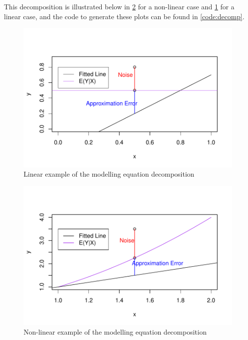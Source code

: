 \documentclass[nohyperref]{article}
\theoremstyle{plain}
\theoremstyle{definition}
\theoremstyle{remark}
\begin{document}
This decomposition is illustrated below in \cref{decompNonLinear} for a non-linear case and \cref{decompLinear} for a linear case, and the code to generate these plots can be found in \cref{code:decomp}.
\begin{figure}[!h]
\begin{center}
\centerline{\includegraphics[width=\columnwidth]{decompLinear.pdf}}
\caption{Linear example of the modelling equation decomposition}
\label{decompLinear}
\end{center}
\end{figure}


\pagebreak

\begin{figure}[!h]
\begin{center}
\centerline{\includegraphics[width=\columnwidth]{decompNonLinear.pdf}}
\caption{Non-linear example of the modelling equation decomposition}
\label{decompNonLinear}
\end{center}
\end{figure}
\end{document}
